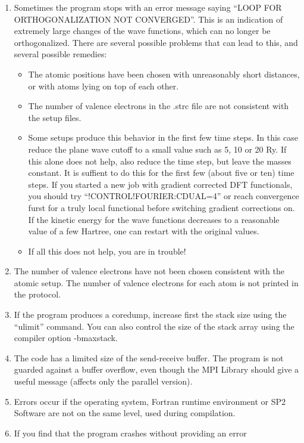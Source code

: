 \documentclass[final,12pt]{article}
\begin{document}
\begin{enumerate}
\item Sometimes the program stops with an error message saying 
  ``LOOP FOR ORTHOGONALIZATION NOT CONVERGED''. This is an indication
  of extremely large changes of the wave functions, which can no
  longer be orthogonalized. There are several possible problems that can
  lead to this, and several possible remedies: 
  \begin{itemize}
  \item The atomic positions have been chosen with unreasonably short
    distances, or with atoms lying on top of each other.
  \item The number of valence electrons in the .strc file are not
    consistent with the setup files.
  \item Some setups produce this behavior in the first few time steps.
    In this case reduce the plane wave cutoff to a small value such as
    5, 10 or 20 Ry. If this alone does not help, also reduce the
    time step, but leave the masses constant. It is suffient to do
    this for the first few (about five or ten) time steps. If you
    started a new job with gradient corrected DFT functionals, you
    should try ``!CONTROL!FOURIER:CDUAL=4'' or reach convergence furst
    for a truly local functional before switching gradient corrections
    on. If the kinetic energy for the wave functions decreases to a
    reasonable value of a few Hartree, one can restart with the
    original values.
  \item If all this does not help, you are in trouble!
  \end{itemize}
\item{The number of valence electrons have not been chosen consistent with
    the atomic setup. The number of valence electrons for each atom is
    not printed in the protocol.}
\item If the program produces a coredump, increase first the stack size
  using the ``ulimit'' command. You can also control the size of the stack
  array using the compiler option -bmaxstack.
\item The code has a limited size of the send-receive buffer. The
  program is not guarded against a buffer overflow, even though the MPI
  Library should give a useful message (affects only the parallel
  version).
\item Errors occur if the operating system, Fortran runtime
  environment or SP2 Software are not on the same level, 
  used during compilation.
\item If you find that the program crashes without providing an error

\end{enumerate}
\end{document}
